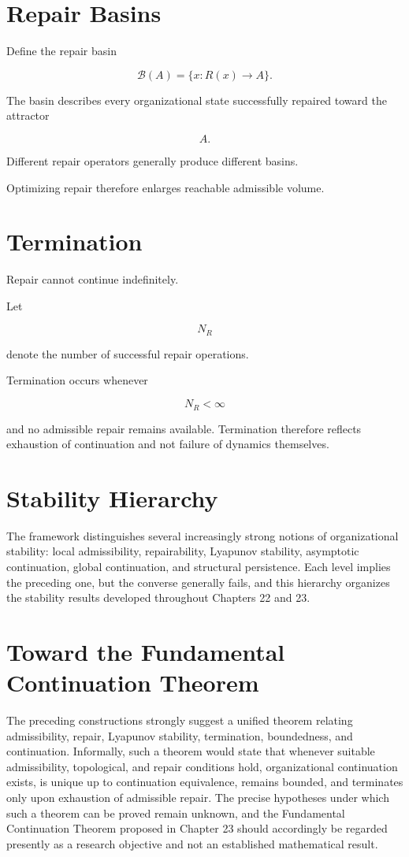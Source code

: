 \documentclass[11pt,oneside]{book}
\numberwithin{equation}{chapter}
\theoremstyle{definition}
\theoremstyle{plain}
\begin{document}
\section{Repair Basins}

Define the repair basin

\[
\mathcal B(A)
=
\{
x
:
R(x)
\rightarrow
A
\}.
\]

The basin describes every organizational state successfully repaired
toward the attractor

\[
A.
\]

Different repair operators generally produce different basins.

Optimizing repair therefore enlarges reachable admissible volume.

\section{Termination}

Repair cannot continue indefinitely.

Let

\[
N_R
\]

denote the number of successful repair operations.

Termination occurs whenever

\[
N_R
<
\infty
\]

and no admissible repair remains available. Termination therefore reflects exhaustion of continuation and not failure of dynamics themselves.

\section{Stability Hierarchy}

The framework distinguishes several increasingly strong notions of organizational stability: local admissibility, repairability, Lyapunov stability, asymptotic continuation, global continuation, and structural persistence. Each level implies the preceding one, but the converse generally fails, and this hierarchy organizes the stability results developed throughout Chapters 22 and 23.

\section{Toward the Fundamental Continuation Theorem}

The preceding constructions strongly suggest a unified theorem relating admissibility, repair, Lyapunov stability, termination, boundedness, and continuation. Informally, such a theorem would state that whenever suitable admissibility, topological, and repair conditions hold, organizational continuation exists, is unique up to continuation equivalence, remains bounded, and terminates only upon exhaustion of admissible repair. The precise hypotheses under which such a theorem can be proved remain unknown, and the Fundamental Continuation Theorem proposed in Chapter 23 should accordingly be regarded presently as a research objective and not an established mathematical result.
\end{document}

